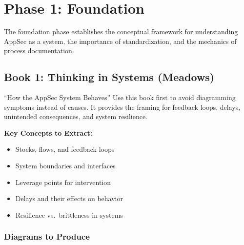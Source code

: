 \documentclass[11pt,letterpaper]{article}
\begin{document}
\section{Phase 1: Foundation}

The foundation phase establishes the conceptual framework for understanding AppSec as a system, the importance of standardization, and the mechanics of process documentation.

\subsection{Book 1: Thinking in Systems (Meadows)}

\begin{bookbox}{``How the AppSec System Behaves''}
Use this book first to avoid diagramming symptoms instead of causes. It provides the framing for feedback loops, delays, unintended consequences, and system resilience.

\vspace{0.5cm}

\textbf{Key Concepts to Extract:}
\begin{itemize}[nosep]
    \item Stocks, flows, and feedback loops
    \item System boundaries and interfaces
    \item Leverage points for intervention
    \item Delays and their effects on behavior
    \item Resilience vs.\ brittleness in systems
\end{itemize}
\end{bookbox}

\subsubsection{Diagrams to Produce}
\end{document}
